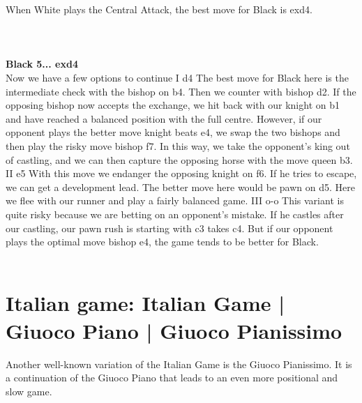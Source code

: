 \documentclass{article}
\begin{document}
When White plays the Central Attack, the best move for Black is exd4.\\
\\

\\
\\
\textbf{Black 5... exd4}\\
Now we have a few options to continue
I d4
The best move for Black here is the intermediate check with the bishop on b4. Then we counter with bishop d2. If the opposing bishop now accepts the exchange, we hit back with our knight on b1 and have reached a balanced position with the full centre.
However, if our opponent plays the better move knight beats e4, we swap the two bishops and then play the risky move bishop f7. In this way, we take the opponent's king out of castling, and we can then capture the opposing horse with the move queen b3.
II e5
With this move we endanger the opposing knight on f6. If he tries to escape, we can get a development lead. The better move here would be pawn on d5. Here we flee with our runner and play a fairly balanced game.
III o-o
This variant is quite risky because we are betting on an opponent's mistake. If he castles after our castling, our pawn rush is starting with c3 takes c4. But if our opponent plays the optimal move bishop e4, the game tends to be better for Black.\\
\\
\section{Italian game: Italian Game | Giuoco Piano | Giuoco Pianissimo}

Another well-known variation of the Italian Game is the Giuoco Pianissimo. It is a continuation of the Giuoco Piano that leads to an even more positional and slow game.
\end{document}

